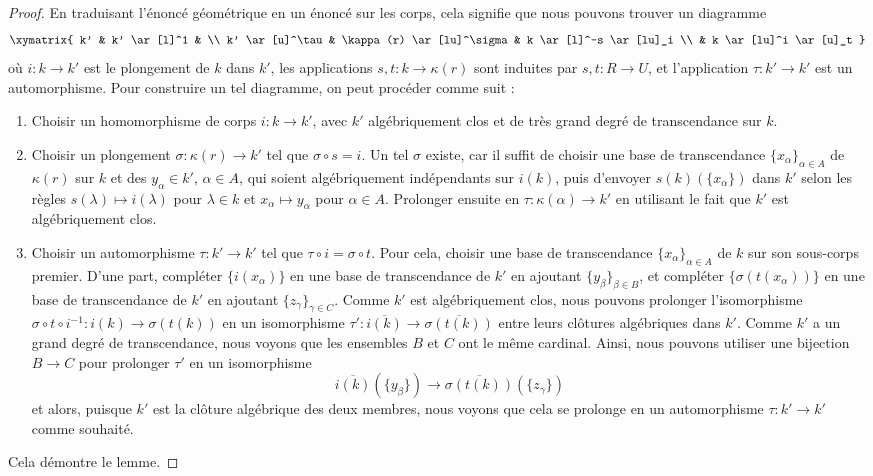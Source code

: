 \begin{proof}
En traduisant l'énoncé géométrique en un énoncé sur les corps,
cela signifie que nous pouvons trouver un diagramme
$$
\xymatrix{
k' & k' \ar[l]^1 & \\
k' \ar[u]^\tau & \kappa(r) \ar[lu]^\sigma & k \ar[l]^-s \ar[lu]_i \\
& k \ar[lu]^i \ar[u]_t
}
$$
où $i : k \to k'$ est le plongement de $k$ dans $k'$,
les applications $s, t : k \to \kappa(r)$ sont induites par $s, t : R \to U$, et
l'application $\tau : k' \to k'$ est un automorphisme. Pour construire un tel
diagramme, on peut procéder comme suit :
\begin{enumerate}
\item Choisir un homomorphisme de corps $i : k \to k'$, avec $k'$ algébriquement clos et de
très grand degré de transcendance sur $k$.
\item Choisir un plongement $\sigma : \kappa(r) \to k'$ tel que
$\sigma \circ s = i$. Un tel $\sigma$ existe, car il suffit de
choisir une base de transcendance $\{x_\alpha\}_{\alpha \in A}$ de $\kappa(r)$
sur $k$ et des $y_\alpha \in k'$, $\alpha \in A$, qui soient algébriquement
indépendants sur $i(k)$, puis d'envoyer $s(k)(\{x_\alpha\})$ dans $k'$
selon les règles $s(\lambda) \mapsto i(\lambda)$ pour $\lambda \in k$
et $x_\alpha \mapsto y_\alpha$ pour $\alpha \in A$.
Prolonger ensuite en $\tau : \kappa(\alpha) \to k'$ en utilisant le fait que $k'$ est
algébriquement clos.
\item Choisir un automorphisme $\tau : k' \to k'$ tel que
$\tau \circ i = \sigma \circ t$. Pour cela, choisir une base de transcendance
$\{x_\alpha\}_{\alpha \in A}$ de $k$ sur son sous-corps premier.
D'une part, compléter $\{i(x_\alpha)\}$ en une base de transcendance de
$k'$ en ajoutant $\{y_\beta\}_{\beta \in B}$, et compléter
$\{\sigma(t(x_\alpha))\}$ en une base de transcendance de $k'$ en ajoutant
$\{z_\gamma\}_{\gamma \in C}$.
Comme $k'$ est algébriquement clos, nous pouvons prolonger l'isomorphisme
$\sigma \circ t \circ i^{-1} : i(k) \to \sigma(t(k))$
en un isomorphisme $\tau' : \overline{i(k)} \to \overline{\sigma(t(k))}$
entre leurs clôtures algébriques dans $k'$.
Comme $k'$ a un grand degré de transcendance,
nous voyons que les ensembles $B$ et $C$ ont le même cardinal.
Ainsi, nous pouvons utiliser une bijection
$B \to C$ pour prolonger $\tau'$ en un isomorphisme
$$
\overline{i(k)}(\{y_\beta\})
\longrightarrow
\overline{\sigma(t(k))}(\{z_\gamma\})
$$
et alors, puisque $k'$ est la clôture algébrique des deux membres, nous
voyons que cela se prolonge en un automorphisme $\tau : k' \to k'$
comme souhaité.
\end{enumerate}
Cela démontre le lemme.
\end{proof}

